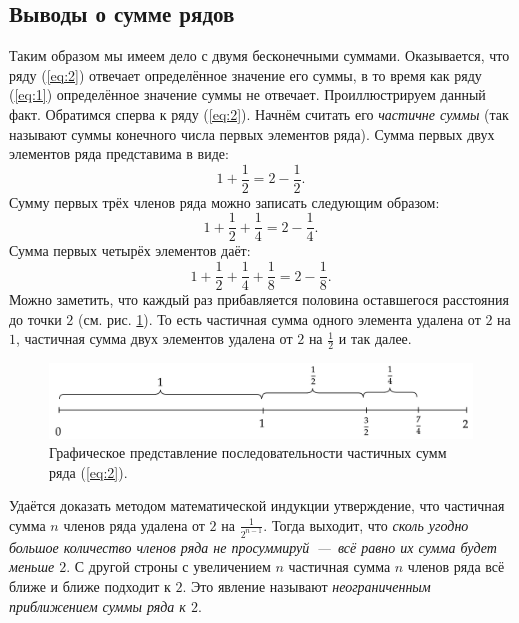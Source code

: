 \documentclass[12pt]{article}
\begin{document}
\subsection{Выводы о сумме рядов}
Таким образом мы имеем дело с двумя бесконечными суммами. Оказывается, что ряду (\ref{eq:2}) отвечает определённое значение его суммы, в то время как ряду (\ref{eq:1}) определённое значение суммы не отвечает. Проиллюстрируем данный факт. Обратимся сперва к ряду (\ref{eq:2}). Начнём считать его \emph{частичне суммы} (так называют суммы конечного числа первых элементов ряда). Сумма первых двух элементов ряда представима в виде:
\begin{equation}
    1 + \dfrac12 = 2 - \dfrac12.
\end{equation}
Сумму первых трёх членов ряда можно записать следующим образом:
\begin{equation}
    1 + \dfrac12 + \dfrac14 = 2 - \dfrac14.
\end{equation}
Сумма первых четырёх элементов даёт:
\begin{equation}
    1 + \dfrac12 + \dfrac14 + \dfrac18 = 2 - \dfrac18.
\end{equation}
Можно заметить, что каждый раз прибавляется половина оставшегося расстояния до точки $2$ (см. рис. \ref{fig:1}). То есть частичная сумма одного элемента удалена от $2$ на $1$, частичная сумма двух элементов удалена от $2$ на $\tfrac12$ и так далее. 
\begin{figure}[h]
    \centering
    \includegraphics[width = 1\textwidth]{fig1.png}
    \caption{Графическое представление последовательности частичных сумм ряда (\ref{eq:2}).}
    \label{fig:1}
\end{figure}
Удаётся доказать методом математической индукции утверждение, что частичная сумма $n$ членов ряда удалена от $2$ на $\tfrac1{2^{n-1}}$. Тогда выходит, что \emph{сколь угодно большое количество членов ряда не просуммируй~\----~всё равно их сумма будет меньше $2$}. С другой строны с увеличением $n$ частичная сумма $n$ членов ряда всё ближе и ближе подходит к $2$. Это явление называют \emph{неограниченным приближением суммы ряда к $2$}.
\end{document}
